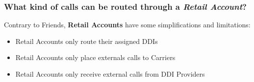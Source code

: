 \documentclass[letterpaper,10pt,english]{sphinxmanual}
\begin{document}
\subsubsection{What kind of calls can be routed through a \emph{Retail Account}?}
\label{administration_portal/client/retail/retail_accounts:what-kind-of-calls-can-be-routed-through-a-retail-account}
Contrary to Friends, \textbf{Retail Accounts} have some simplifications and limitations:
\begin{itemize}
\item {} 
Retail Accounts only route their assigned DDIs

\item {} 
Retail Accounts only place externals calls to Carriers

\item {} 
Retail Accounts only receive external calls from DDI Providers

\end{itemize}
\end{document}
